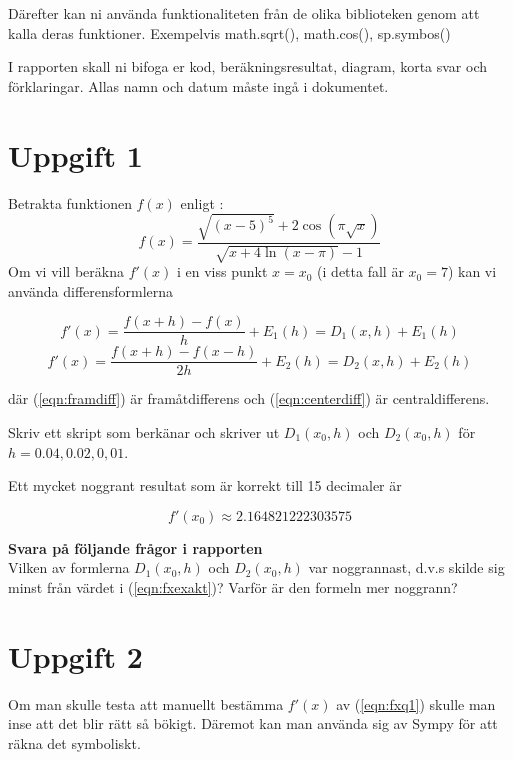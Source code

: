 \documentclass[a4paper]{article}
\begin{document}
Därefter kan ni använda funktionaliteten från de olika biblioteken genom att 
kalla deras funktioner. Exempelvis math.sqrt(), math.cos(), sp.symbos()

I rapporten skall ni bifoga er kod, beräkningsresultat, diagram, korta svar och förklaringar. 
Allas namn och datum måste ingå i dokumentet.

\section{Uppgift 1}

Betrakta funktionen \( f(x) \) enligt :
\begin{equation} \label{eqn:fxq1}
f(x)=\frac{\sqrt{(x-5)^5}+2\cos (\pi\sqrt{x})}{\sqrt{x+4 \ln (x-\pi)}-1}
\end{equation}
Om vi vill beräkna \( f'(x) \) i en viss punkt \( x=x_0 \) 
(i detta fall är \( x_0=7 \)) kan vi använda differensformlerna

\begin{equation} \label{eqn:framdiff}
f'(x)=\frac{f(x+h)-f(x)}{h}+E_1(h)=D_1(x,h)+E_1(h)
\end{equation}
\begin{equation} \label{eqn:centerdiff}
f'(x)=\frac{f(x+h)-f(x-h)}{2h}+E_2(h)=D_2(x,h)+E_2(h)
\end{equation}

där (\ref{eqn:framdiff}) är framåtdifferens och (\ref{eqn:centerdiff}) är centraldifferens. 

Skriv ett skript som berkänar och skriver ut \( D_1(x_0,h) \)
och  \( D_2(x_0,h) \) för \( h=0.04,0.02,0,01 \). 

Ett mycket noggrant resultat som är korrekt till 15 decimaler är 

\begin{equation} \label{eqn:fxexakt}
f'(x_0)\approx 2.164821222303575
\end{equation}

\textbf{Svara på följande frågor i rapporten}\\
Vilken av formlerna  \( D_1(x_0,h) \) och  \( D_2(x_0,h) \) var noggrannast, 
d.v.s skilde sig minst från värdet i (\ref{eqn:fxexakt})? Varför är den formeln mer noggrann?


\newpage
\section{Uppgift 2} 
Om man skulle testa att manuellt bestämma \( f'(x) \) av (\ref{eqn:fxq1})
skulle man inse att det blir rätt så bökigt. Däremot kan man använda sig av Sympy för att räkna det symboliskt.
\end{document}
